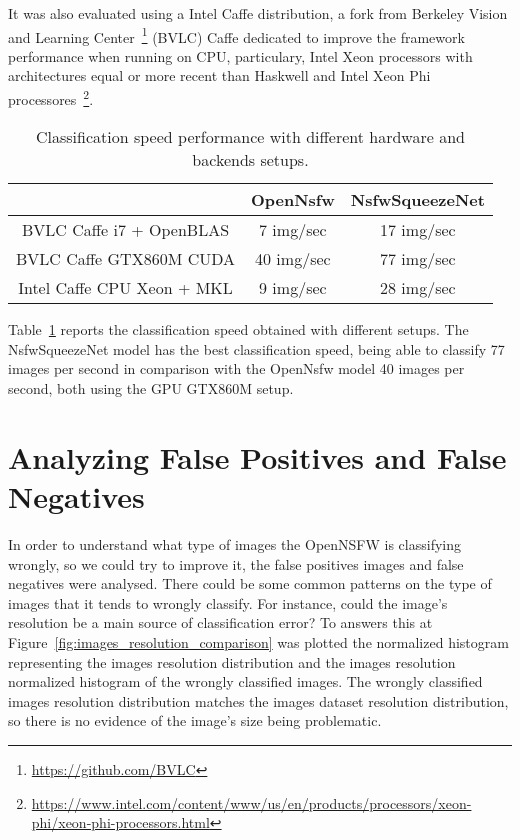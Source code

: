 It was also evaluated using a Intel Caffe distribution, a fork from
Berkeley Vision and Learning Center~\footnote{\url{https://github.com/BVLC}} (BVLC) Caffe dedicated to improve the framework performance when running on CPU, particulary, Intel Xeon processors with architectures equal or more recent than Haskwell and Intel Xeon Phi processores~\footnote{\url{https://www.intel.com/content/www/us/en/products/processors/xeon-phi/xeon-phi-processors.html}}.

\begin{table}[]
\centering
\caption{Classification speed performance with different hardware and backends setups.}
\label{tbl:hweval}
\begin{tabular}{ccc}
\hline
\multicolumn{1}{|c|}{}                           & \multicolumn{1}{c|}{OpenNsfw} & \multicolumn{1}{c|}{NsfwSqueezeNet} \\ \hline
\multicolumn{1}{|c|}{BVLC Caffe i7 + OpenBLAS}   & \multicolumn{1}{c|}{7 img/sec}        & \multicolumn{1}{c|}{17 img/sec}             \\ \hline
\multicolumn{1}{|c|}{BVLC Caffe GTX860M CUDA}    & \multicolumn{1}{c|}{40 img/sec}       & \multicolumn{1}{c|}{77 img/sec}             \\ \hline
\multicolumn{1}{|c|}{Intel Caffe CPU Xeon + MKL} & \multicolumn{1}{c|}{9 img/sec}        & \multicolumn{1}{c|}{28 img/sec}               \\ \hline          
\end{tabular}
\end{table}

Table~\ref{tbl:hweval} reports the classification speed obtained with different setups. The NsfwSqueezeNet model has the best classification speed, being able to classify 77 images per second in comparison with the OpenNsfw model 40 images per second, both using the GPU GTX860M setup.


\section{Analyzing False Positives and False Negatives}

In order to understand what type of images the OpenNSFW is classifying wrongly, so we could try to improve it, the false positives images and false negatives were analysed. There could be some common patterns on the type of images that it tends to wrongly classify. For instance, could the image's resolution be a main source of classification error? To answers this at Figure~\ref{fig:images_resolution_comparison} was plotted the normalized histogram representing the images resolution distribution and the images resolution normalized histogram of the wrongly classified images. The wrongly classified images resolution distribution matches the images dataset resolution distribution, so there is no evidence of the image's size being problematic.


